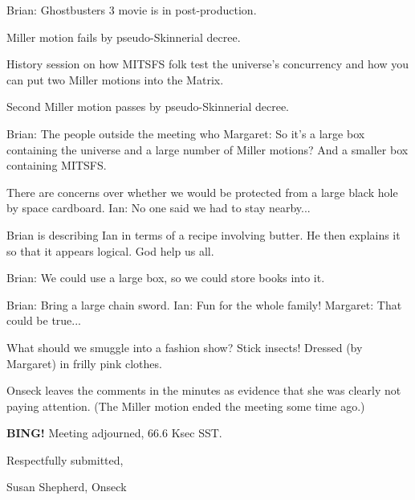 \documentclass[10pt]{article}
\newcommand{\bing}{{\bf BING!} }
\begin{document}
Brian: Ghostbusters 3 movie is in post-production.

Miller motion fails by pseudo-Skinnerial decree.

History session on how MITSFS folk test the universe's concurrency and how you can put two Miller motions into the Matrix.

Second Miller motion passes by pseudo-Skinnerial decree.

Brian: The people outside the meeting who 
Margaret: So it's a large box containing the universe and a large number of Miller motions? And a smaller box containing MITSFS.

There are concerns over whether we would be protected from a large black hole by space cardboard.
Ian: No one said we had to stay nearby...

Brian is describing Ian in terms of a recipe involving butter. He then explains it so that it appears logical. God help us all.

Brian: We could use a large box, so we could store books into it.

Brian: Bring a large chain sword.
Ian: Fun for the whole family!
Margaret: That could be true...

What should we smuggle into a fashion show? Stick insects! Dressed (by Margaret) in frilly pink clothes.

Onseck leaves the comments in the minutes as evidence that she was clearly not paying attention. (The Miller motion ended the meeting some time ago.)

\bing
\noindent
Meeting adjourned, 66.6 Ksec SST.

\vspace{18pt}

\centerline{Respectfully submitted,}
\centerline{Susan Shepherd, Onseck}
\end{document}
